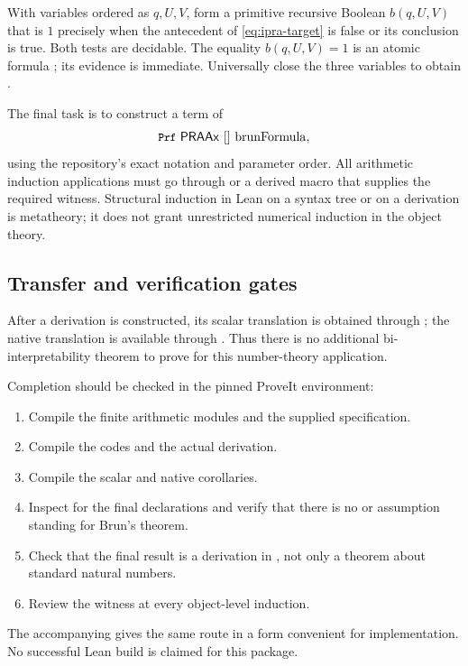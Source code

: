 With variables ordered as \(q,U,V\), form a primitive recursive Boolean
\(b(q,U,V)\) that is \(1\) precisely when the antecedent of
\eqref{eq:ipra-target} is false or its conclusion is true.
Both tests are decidable. The equality \(b(q,U,V)=1\) is an atomic
formula ; its  evidence is immediate.
Universally close the three variables to obtain
.

The final task is to construct a term of
\[
 \code{Prf}\ \mathsf{PRAAx}\ []\ \mathrm{brunFormula},
\]
using the repository's exact notation and parameter order.
All arithmetic induction applications must go through
 or a derived macro that supplies the required
 witness.
Structural induction in Lean on a syntax tree or on a derivation is
metatheory; it does not grant unrestricted numerical induction in the
object theory.

\subsection{Transfer and verification gates}

After a derivation  is constructed, its scalar translation
is obtained through ; the native translation is
available through . Thus there is no additional
bi-interpretability theorem to prove for this number-theory application.

Completion should be checked in the pinned ProveIt environment:
\begin{enumerate}
\item Compile the finite arithmetic modules and the supplied specification.
\item Compile the  codes and the actual
 derivation.
\item Compile the scalar and native corollaries.
\item Inspect  for the final declarations and verify
that there is no  or assumption standing for Brun's theorem.
\item Check that the final result is a derivation in , not
only a theorem about standard natural numbers.
\item Review the  witness at every object-level induction.
\end{enumerate}
The accompanying  gives the same route in a
form convenient for implementation. No successful Lean build is claimed
for this package.
